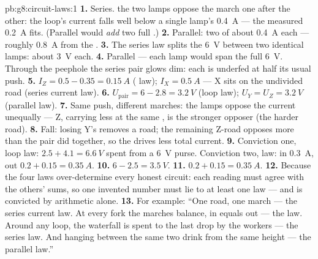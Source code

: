 \begin{solution}{pb:g8:circuit-laws:1}
\textbf{1.} Series.  the two lamps oppose the march
one after the other: the loop's current falls well below a
single lamp's \qty{0.4}{A} --- the measured \qty{0.2}{A} fits.
(Parallel would \emph{add} two full .)
\textbf{2.} Parallel: two  of about \qty{0.4}{A} each
--- roughly \qty{0.8}{A} from the .
\textbf{3.} The series  law splits the \qty{6}{V}
between two identical lamps: about \qty{3}{V} each.
\textbf{4.} Parallel --- each lamp would span the full
\qty{6}{V}. Through the peephole the series pair glows dim:
each is underfed at half its usual push.
\textbf{5.} $I_Z = 0.5 - 0.35 = \qty{0.15}{A}$ ( law);
$I_X = \qty{0.5}{A}$ --- X sits on the undivided road (series
current law).
\textbf{6.} $U_{\text{pair}} = 6 - 2.8 = \qty{3.2}{V}$ (loop
law); $U_Y = U_Z = \qty{3.2}{V}$ (parallel law).
\textbf{7.} Same push, different marches: the lamps oppose the
current unequally --- Z, carrying less at the same , is
the stronger opposer (the harder road).
\textbf{8.} Fall: losing Y's  removes a road; the
remaining Z-road opposes more than the pair did together, so
the  drives less total current.
\textbf{9.} Conviction one, loop law: $2.5 + 4.1 =
\qty{6.6}{V}$ spent from a \qty{6}{V} purse. Conviction two,
 law: in \qty{0.3}{A}, out $0.2 + 0.15 =
\qty{0.35}{A}$.
\textbf{10.} $6 - 2.5 = \qty{3.5}{V}$.
\textbf{11.} $0.2 + 0.15 = \qty{0.35}{A}$.
\textbf{12.} Because the four laws over-determine every honest
circuit: each reading must agree with the others' sums, so one
invented number must lie to at least one law --- and is
convicted by arithmetic alone.
\textbf{13.} For example: ``One road, one march --- the series
current law. At every fork the marches balance, in equals out
--- the  law. Around any loop, the  waterfall
is spent to the last drop by the workers --- the series 
law. And  hanging between the same two  drink
from the same height --- the parallel  law.''
\end{solution}
